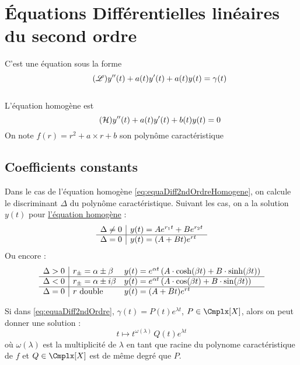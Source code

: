 \documentclass[11pt,a4paper,fleqn,pdftex]{report}
\begin{document}
\section{Équations Différentielles linéaires du second ordre}
\begin{dfn}
    C'est une équation sous la forme 
\begin{equation}\label{eq:equaDiff2ndOrdre}\tag{$\mathscr{L}$}
    y''(t) + a(t) y'(t) + a(t)y(t)= \gamma (t)
\end{equation}
\hfill \\[0.5\baselineskip]
    L'équation homogène est
\begin{equation}\label{eq:equaDiff2ndOrdreHomogene}\tag{$\mathcal{H}$}
    y''(t) + a(t) y'(t) + b(t)y(t)= 0
\end{equation}
On note $f(r) = r^2 + a\times r + b$ %
son polynôme caractéristique
\end{dfn}
\subsection{Coefficients constants}
\begin{itheorem}
Dans le cas de l'équation homogène \eqref{eq:equaDiff2ndOrdreHomogene}, on calcule le discriminant $\Delta$ du polynôme caractéristique. Suivant les cas, on a la solution $y(t)$ pour \uline{l'équation homogène} : 
\[
\begin{array}{r | l}
\Delta \neq 0 & y(t) = A e^{r_1t}+B e^{r_2t}\\
\hline
\Delta = 0 & y(t) = (A+Bt)e^{rt}
\end{array}
\]
Ou encore : 
\[
\begin{array}{r | l l}
\Delta > 0 & r_{\pm}=\alpha \pm \beta &y(t) = e^{\alpha t}\left( A\cdot \cosh(\beta t) + B\cdot \sinh (\beta t) \right)
\\
\hline
\Delta < 0 & r_{\pm}=\alpha \pm i\beta &y(t) = e^{\alpha t}\left( A\cdot \cos(\beta t) + B\cdot \sin (\beta t) \right)
\\
\hline
\Delta = 0 & r \text{ double}& y(t) = (A+Bt)e^{rt}
\end{array}
\]
\end{itheorem}
\begin{theorem}
    Si dans \eqref{eq:equaDiff2ndOrdre}, $\gamma (t)= P(t)e^{\lambda t}$, $P\in \Cmplx [X]$, alors on peut donner une solution :
    \begin{equation}
    t \mapsto t^{\omega(\lambda)}\, Q(t)e^{\lambda t}
    \end{equation}
    où $\omega(\lambda )$ est la multiplicité de $\lambda$ en tant que racine du polynome caractéristique de $f$ et $Q \in \Cmplx[X]$ est de même degré que $P$.
\end{theorem}
\end{document}
